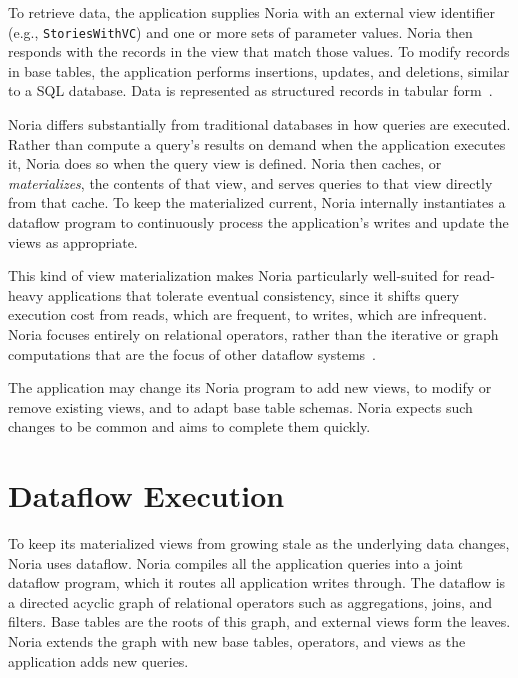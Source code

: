 To retrieve data, the application supplies Noria with an external view
identifier (e.g., \texttt{StoriesWithVC}) and one or more sets of parameter
values. Noria then responds with the records in the view that match those
values. To modify records in base tables, the application performs insertions,
updates, and deletions, similar to a SQL database. Data is represented as
structured records in tabular form~\cite{spanner, bigtable}.

Noria differs substantially from traditional databases in how queries are
executed. Rather than compute a query's results on demand when the
application executes it, Noria does so when the query view is defined.
Noria then caches, or \emph{materializes}, the contents of that view, and serves
queries to that view directly from that cache. To keep the materialized current,
Noria internally instantiates a dataflow program to continuously process the
application's writes and update the views as appropriate.

This kind of view materialization makes Noria particularly well-suited for
read-heavy applications that tolerate eventual consistency, since it shifts
query execution cost from reads, which are frequent, to writes, which are
infrequent. Noria focuses entirely on relational operators, rather than the
iterative or graph computations that are the focus of other dataflow
systems~\cite{naiad, differential-dataflow}.

The application may change its Noria program to add new views, to modify or
remove existing views, and to adapt base table schemas. Noria expects such
changes to be common and aims to complete them quickly.

\section{Dataflow Execution}

To keep its materialized views from growing stale as the underlying data
changes, Noria uses dataflow. Noria compiles all the application queries into a
joint dataflow program, which it routes all application writes through. The
dataflow is a directed acyclic graph of relational operators such as
aggregations, joins, and filters. Base tables are the roots of this graph, and
external views form the leaves. Noria extends the graph with new base tables,
operators, and views as the application adds new queries.

